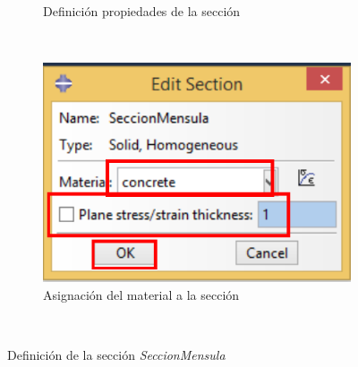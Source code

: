 \begin{enumerate}
\begin{figure}[H]
\begin{subfigure}{0.39\textwidth}
      \caption{Definición propiedades de la sección}
      \label{figu17}
    \end{subfigure}
    ~ %
    \begin{subfigure}{0.39\textwidth}
      \includegraphics[width=\textwidth]{./body/images/imagen18.pdf}
      \caption{Asignación del material a la sección}
      \label{figu18}
    \end{subfigure}
    ~ %
    \caption{Definición de la sección \textit{SeccionMensula}}
  \end{figure}



\end{enumerate}
